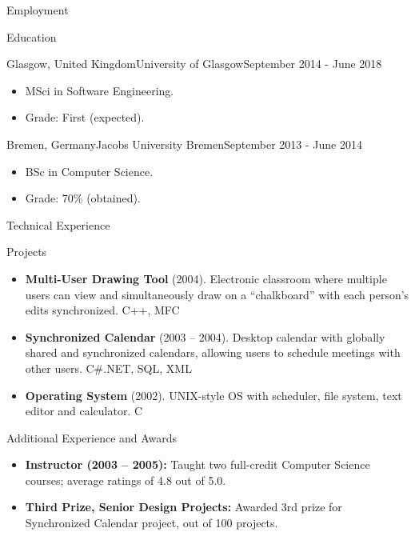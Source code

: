 \documentclass[]{cv}
\begin{document}
\begin{cvsection}{Employment}
	\end{cvsection}
	
	\begin{cvsection}{Education}
		\begin{cvsubsection}{Glasgow, United Kingdom}{University of Glasgow}{September 2014 - June 2018}
			\begin{itemize}
				\item MSci in Software Engineering.
				\item Grade: First (expected).
			\end{itemize}
		\end{cvsubsection}
		\begin{cvsubsection}{Bremen, Germany}{Jacobs University Bremen}{September 2013 - June 2014}
			\begin{itemize}
				\item BSc in Computer Science.
				\item Grade: 70\% (obtained).
			\end{itemize}
		\end{cvsubsection}

	\end{cvsection}
	
	\begin{cvsection}{Technical Experience}
		\begin{cvsubsection}{Projects}{}{}
			\begin{itemize}
				\item \textbf{Multi-User Drawing Tool} (2004). Electronic classroom where multiple users can view and simultaneously draw on a “chalkboard” with each person’s edits synchronized.  C++, MFC
				\item \textbf{Synchronized Calendar} (2003 – 2004). Desktop calendar with globally shared and synchronized calendars, allowing users to schedule meetings with other users.  C\#.NET, SQL, XML
				\item \textbf{Operating System} (2002).  UNIX-style OS with scheduler, file system, text editor and calculator. C
			\end{itemize}
		\end{cvsubsection}
	\end{cvsection}
	
	\begin{cvsection}{Additional Experience and Awards}
		\begin{cvsubsection}{}{}{}	
			\begin{itemize}
				\item \textbf{Instructor (2003 – 2005):} Taught two full-credit Computer Science courses; average ratings of 4.8 out of 5.0.
				\item \textbf{Third Prize, Senior Design Projects:} Awarded 3rd prize for Synchronized Calendar project, out of 100 projects.
			\end{itemize}
		\end{cvsubsection}
	\end{cvsection}
	
\end{document}
